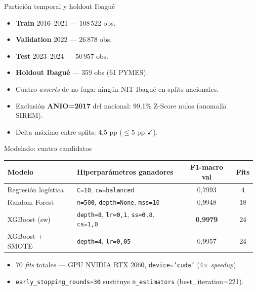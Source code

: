 \documentclass[10pt, aspectratio=169, xcolor=dvipsnames]{beamer}
\begin{document}
\begin{frame}{Partici\'on temporal y holdout Ibagu\'e}
\begin{itemize}
  \item \textbf{Train} 2016--2021 --- 108\,522 obs.
  \item \textbf{Validation} 2022 --- 26\,878 obs.
  \item \textbf{Test} 2023--2024 --- 50\,957 obs.
  \item \textbf{Holdout Ibagu\'e} --- 359 obs (61 PYMES).
  \item Cuatro \emph{asserts} de no-fuga: ning\'un NIT Ibagu\'e en splits nacionales.
  \item Exclusi\'on \textbf{ANIO=2017} del nacional: 99,1\% Z-Score nulos (anomal\'ia SIREM).
  \item Delta m\'aximo entre splits: 4,5 pp ($\leq 5$ pp $\checkmark$).
\end{itemize}
\end{frame}

\begin{frame}{Modelado: cuatro candidatos}
\centering
\small
\setlength{\tabcolsep}{6pt}
\renewcommand{\arraystretch}{1.1}
\begin{tabular}{@{}l l c c@{}}
\toprule
\textbf{Modelo} & \textbf{Hiperpar\'ametros ganadores} & \textbf{F1-macro val} & \textbf{Fits} \\
\midrule
Regresi\'on log\'istica & \texttt{C=10}, \texttt{cw=balanced}                                  & 0,7993 & 4 \\
Random Forest          & \texttt{n=500}, \texttt{depth=None}, \texttt{mss=10}                  & 0,9948 & 18 \\
XGBoost (sw)           & \texttt{depth=8}, \texttt{lr=0,1}, \texttt{ss=0,8}, \texttt{cs=1,0}   & \textbf{0,9979} & 24 \\
XGBoost + SMOTE        & \texttt{depth=4}, \texttt{lr=0,05}                                   & 0,9957 & 24 \\
\bottomrule
\end{tabular}
\medskip
\begin{itemize}
  \item 70 \emph{fits} totales --- GPU NVIDIA RTX 2060, \texttt{device='cuda'} (4$\times$ \emph{speedup}).
  \item \texttt{early\_stopping\_rounds=30} sustituye \texttt{n\_estimators} (best\_iteration=221).
\end{itemize}
\end{frame}
\end{document}
